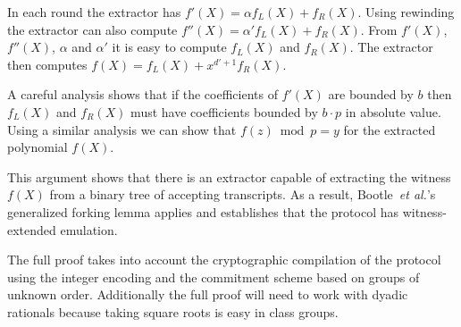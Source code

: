 \documentclass{article}
\theoremstyle{definition}
\begin{document}
In each round the extractor has $f'(X)=\alpha f_L(X)+ f_R(X)$. Using rewinding the extractor can also compute $f''(X)=\alpha' f_L(X)+ f_R(X)$. From $f'(X)$, $f''(X)$, $\alpha$ and $\alpha'$ it is easy to compute $f_L(X)$ and $f_R(X)$. The extractor then computes $f(X)=f_L(X)+x^{d'+1} f_R(X)$.

A careful analysis shows that if the coefficients of $f'(X)$ are bounded by $b$ then $f_L(X)$ and $f_R(X)$ must have coefficients bounded by $b \cdot p$ in absolute value. Using a similar analysis we can show that $f(z)\bmod p=y$ for the extracted polynomial $f(X)$.

This argument shows that there is an extractor capable of extracting the witness $f(X)$ from a binary tree of accepting transcripts. As a result, Bootle~\emph{et al.}'s generalized forking lemma applies and establishes that the protocol has witness-extended emulation.

The full proof takes into account the cryptographic compilation of the protocol using the integer encoding and the commitment scheme based on groups of unknown order. Additionally the full proof will need to work with dyadic rationals because taking square roots is easy in class groups.
\end{document}
